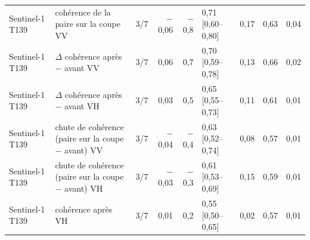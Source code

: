 \begin{table}[htbp]
\begin{tabular}{llcrrlrrr}
Sentinel-1 T139 & cohérence de la paire sur la coupe VV & 3/7 & $-$0{,}06 & $-$0{,}8 & 0{,}71 [0{,}60--0{,}80] & 0{,}17 & 0{,}63 & 0{,}04 \\
Sentinel-1 T139 & $\Delta$ cohérence après $-$ avant VV & 3/7 & 0{,}06 & 0{,}7 & 0{,}70 [0{,}59--0{,}78] & 0{,}13 & 0{,}66 & 0{,}02 \\
Sentinel-1 T139 & $\Delta$ cohérence après $-$ avant VH & 3/7 & 0{,}03 & 0{,}5 & 0{,}65 [0{,}55--0{,}73] & 0{,}11 & 0{,}61 & 0{,}01 \\
Sentinel-1 T139 & chute de cohérence (paire sur la coupe $-$ avant) VV & 3/7 & $-$0{,}04 & $-$0{,}4 & 0{,}63 [0{,}52--0{,}74] & 0{,}08 & 0{,}57 & 0{,}01 \\
Sentinel-1 T139 & chute de cohérence (paire sur la coupe $-$ avant) VH & 3/7 & $-$0{,}03 & $-$0{,}3 & 0{,}61 [0{,}53--0{,}69] & 0{,}15 & 0{,}59 & 0{,}01 \\
Sentinel-1 T139 & cohérence après VH & 3/7 & 0{,}01 & 0{,}2 & 0{,}55 [0{,}50--0{,}65] & 0{,}02 & 0{,}57 & 0{,}01 \\
\bottomrule
\end{tabular}
\end{table}
